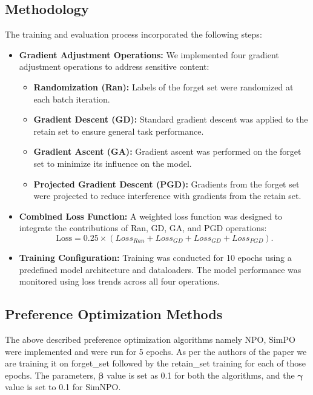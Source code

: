 \documentclass[11pt]{article}
\begin{document}
    \subsection{Methodology}
    The training and evaluation process incorporated the following steps:
    \begin{itemize}
        \item \textbf{Gradient Adjustment Operations:} We implemented four gradient adjustment operations to address sensitive content:
        \begin{itemize}
            \item \textbf{Randomization (Ran):} Labels of the forget set were randomized at each batch iteration.
            \item \textbf{Gradient Descent (GD):} Standard gradient descent was applied to the retain set to ensure general task performance.
            \item \textbf{Gradient Ascent (GA):} Gradient ascent was performed on the forget set to minimize its influence on the model.
            \item \textbf{Projected Gradient Descent (PGD):} Gradients from the forget set were projected to reduce interference with gradients from the retain set.
        \end{itemize}
        \item \textbf{Combined Loss Function:} A weighted loss function was designed to integrate the contributions of Ran, GD, GA, and PGD operations:
        \[
            \text{Loss} = 0.25 \times (Loss_{Ran} + Loss_{GD} + Loss_{GD} + Loss_{PGD}).
        \]
        \item \textbf{Training Configuration:} Training was conducted for 10 epochs using a predefined model architecture and dataloaders. The model performance was monitored using loss trends across all four operations.
    \end{itemize}

    \subsection{Preference Optimization Methods}
    The above described preference optimization algorithms namely NPO, SimPO were implemented and were run for 5 epochs. As per the authors of the paper we are training it on forget\_set followed by the retain\_set training for each of those epochs. The parameters, $\boldsymbol{\beta}$  value is set as 0.1 for both the algorithms, and the $\boldsymbol{\gamma}$ value is set to 0.1 for SimNPO.
\end{document}

